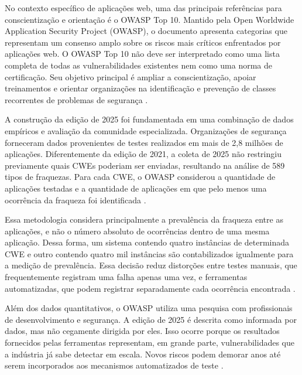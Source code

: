 No contexto específico de aplicações web, uma das principais referências para conscientização e orientação é o OWASP Top 10. Mantido pela Open Worldwide Application Security Project (OWASP), o documento apresenta categorias que representam um consenso amplo sobre os riscos mais críticos enfrentados por aplicações web. O OWASP Top 10 não deve ser interpretado como uma lista completa de todas as vulnerabilidades existentes nem como uma norma de certificação. Seu objetivo principal é ampliar a conscientização, apoiar treinamentos e orientar organizações na identificação e prevenção de classes recorrentes de problemas de segurança \cite{owasp_top10_2025_intro}.

A construção da edição de 2025 foi fundamentada em uma combinação de dados empíricos e avaliação da comunidade especializada. Organizações de segurança forneceram dados provenientes de testes realizados em mais de 2,8 milhões de aplicações. Diferentemente da edição de 2021, a coleta de 2025 não restringiu previamente quais CWEs poderiam ser enviadas, resultando na análise de 589 tipos de fraquezas. Para cada CWE, o OWASP considerou a quantidade de aplicações testadas e a quantidade de aplicações em que pelo menos uma ocorrência da fraqueza foi identificada \cite{owasp_top10_2025_intro}.

Essa metodologia considera principalmente a prevalência da fraqueza entre as aplicações, e não o número absoluto de ocorrências dentro de uma mesma aplicação. Dessa forma, um sistema contendo quatro instâncias de determinada CWE e outro contendo quatro mil instâncias são contabilizados igualmente para a medição de prevalência. Essa decisão reduz distorções entre testes manuais, que frequentemente registram uma falha apenas uma vez, e ferramentas automatizadas, que podem registrar separadamente cada ocorrência encontrada \cite{owasp_top10_2025_intro}. 

Além dos dados quantitativos, o OWASP utiliza uma pesquisa com profissionais de desenvolvimento e segurança. A edição de 2025 é descrita como informada por dados, mas não cegamente dirigida por eles. Isso ocorre porque os resultados fornecidos pelas ferramentas representam, em grande parte, vulnerabilidades que a indústria já sabe detectar em escala. Novos riscos podem demorar anos até serem incorporados aos mecanismos automatizados de teste \cite{owasp_top10_2025_intro}.

